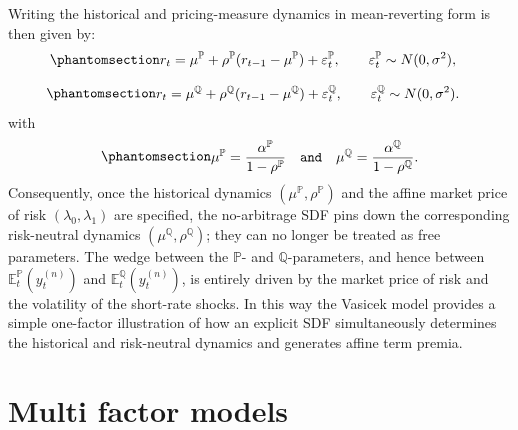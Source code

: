 \documentclass[
  letterpaper,
  DIV=11,
  numbers=noendperiod]{scrreprt}
\begin{document}
Writing the historical and pricing-measure dynamics in mean-reverting
form is then given by:
\begin{equation}\protect\phantomsection\label{eq-vasicek-P-meanrev}{
\begin{align}
    r_t 
    &= \mu^{\mathbb{P}} + \rho^{\mathbb{P}} (r_{t-1} - \mu^{\mathbb{P}}) 
        + \varepsilon_t^{\mathbb{P}}, 
        \qquad \varepsilon_t^{\mathbb{P}} \sim N(0,\sigma^2), 
\end{align}
}\end{equation}

\begin{equation}\protect\phantomsection\label{eq-vasicek-Q-meanrev}{
\begin{align}
    r_t 
    &= \mu^{\mathbb{Q}} + \rho^{\mathbb{Q}} (r_{t-1} - \mu^{\mathbb{Q}}) 
        + \varepsilon_t^{\mathbb{Q}}, 
        \qquad \varepsilon_t^{\mathbb{Q}} \sim N(0,\sigma^2).
\end{align}
}\end{equation} with
\begin{equation}\protect\phantomsection\label{eq-muP-def}{
\begin{align}
    \mu^{\mathbb{P}} 
    = \frac{\alpha^{\mathbb{P}}}{1-\rho^{\mathbb{P}}}
    \quad \texttt{and} \quad   \mu^{\mathbb{Q}} 
    = \frac{\alpha^{\mathbb{Q}}}{1-\rho^{\mathbb{Q}}}.
\end{align}
}\end{equation} Consequently, once the historical dynamics
\((\mu^{\mathbb{P}},\rho^{\mathbb{P}})\) and the affine market price of
risk \((\lambda_0,\lambda_1)\) are specified, the no-arbitrage SDF pins
down the corresponding risk-neutral dynamics
\((\mu^{\mathbb{Q}},\rho^{\mathbb{Q}})\); they can no longer be treated
as free parameters. The wedge between the \(\mathbb{P}\)- and
\(\mathbb{Q}\)-parameters, and hence between
\(\mathbb{E}_t^{\mathbb{P}}(y_t^{(n)})\) and
\(\mathbb{E}_t^{\mathbb{Q}}(y_t^{(n)})\), is entirely driven by the
market price of risk and the volatility of the short-rate shocks. In
this way the Vasicek model provides a simple one-factor illustration of
how an explicit SDF simultaneously determines the historical and
risk-neutral dynamics and generates affine term premia.


\chapter{Multi factor models}\label{multi-factor-models}
\end{document}
